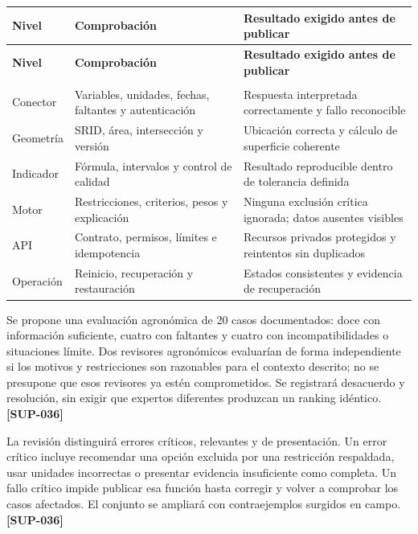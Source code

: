 \documentclass[10pt,a4paper]{article}
\begin{document}
\begingroup\small
\begin{longtable}{>{\raggedright\arraybackslash}p{3.647cm}>{\raggedright\arraybackslash}p{5.867cm}>{\raggedright\arraybackslash}p{6.343cm}}
\toprule
\textbf{Nivel} & \textbf{Comprobación} & \textbf{Resultado exigido antes de publicar} \\
\midrule\endfirsthead
\toprule
\textbf{Nivel} & \textbf{Comprobación} & \textbf{Resultado exigido antes de publicar} \\
\midrule\endhead
\midrule\multicolumn{3}{r}{\scriptsize Continúa en la página siguiente}\\\endfoot
\bottomrule\endlastfoot
Conector & Variables, unidades, fechas, faltantes y autenticación & Respuesta interpretada correctamente y fallo reconocible \\[3pt]
Geometría & SRID, área, intersección y versión & Ubicación correcta y cálculo de superficie coherente \\[3pt]
Indicador & Fórmula, intervalos y control de calidad & Resultado reproducible dentro de tolerancia definida \\[3pt]
Motor & Restricciones, criterios, pesos y explicación & Ninguna exclusión crítica ignorada; datos ausentes visibles \\[3pt]
API & Contrato, permisos, límites e idempotencia & Recursos privados protegidos y reintentos sin duplicados \\[3pt]
Operación & Reinicio, recuperación y restauración & Estados consistentes y evidencia de recuperación \\[3pt]
\end{longtable}
\endgroup

Se propone una evaluación agronómica de 20 casos documentados: doce con información suficiente, cuatro con faltantes y cuatro con incompatibilidades o situaciones límite. Dos revisores agronómicos evaluarían de forma independiente si los motivos y restricciones son razonables para el contexto descrito; no se presupone que esos revisores ya estén comprometidos. Se registrará desacuerdo y resolución, sin exigir que expertos diferentes produzcan un ranking idéntico. \textbf{[SUP-036]}


La revisión distinguirá errores críticos, relevantes y de presentación. Un error crítico incluye recomendar una opción excluida por una restricción respaldada, usar unidades incorrectas o presentar evidencia insuficiente como completa. Un fallo crítico impide publicar esa función hasta corregir y volver a comprobar los casos afectados. El conjunto se ampliará con contraejemplos surgidos en campo. \textbf{[SUP-036]}
\end{document}
